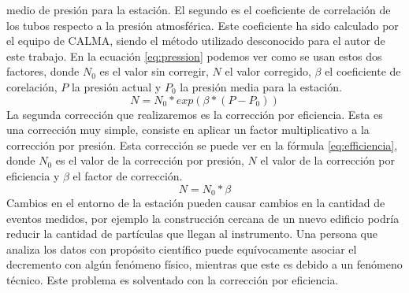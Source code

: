 		medio de presión para la estación. El segundo es el coeficiente de correlación de los tubos respecto a la presión atmosférica. Este
		coeficiente ha sido calculado por el equipo de CALMA, siendo el método utilizado desconocido para el autor de este trabajo. En la
		ecuación \ref{eq:pression} podemos ver como se usan estos dos factores, donde $N_0$ es el valor sin corregir, $N$ el valor corregido,
		$\beta$ el coeficiente de corelación, $P$ la presión actual y $P_0$ la presión media para la estación.
		\begin{equation}\label{eq:pression}
		  N=N_0*exp(\beta*(P-P_0))
		\end{equation}
		La segunda corrección que realizaremos es la corrección por eficiencia. Esta es una corrección muy simple, consiste en aplicar un
		factor multiplicativo a la corrección por presión. Esta corrección se puede ver en la fórmula \ref{eq:efficiencia}, donde $N_0$ es el
		valor de la corrección por presión, $N$ el valor de la corrección por eficiencia y $\beta$ el factor de corrección. 
		\begin{equation}\label{eq:efficiencia}
		  N=N_0*\beta
		\end{equation}
		Cambios en el entorno de la estación pueden causar cambios en la cantidad de eventos medidos, por ejemplo la construcción cercana de
		un nuevo edificio podría reducir la cantidad de partículas que llegan al instrumento. Una persona que analiza los datos con propósito
		científico puede equívocamente asociar el decremento con algún fenómeno físico, mientras que este es debido a un fenómeno técnico.
		Este problema es solventado con la corrección por eficiencia.   

